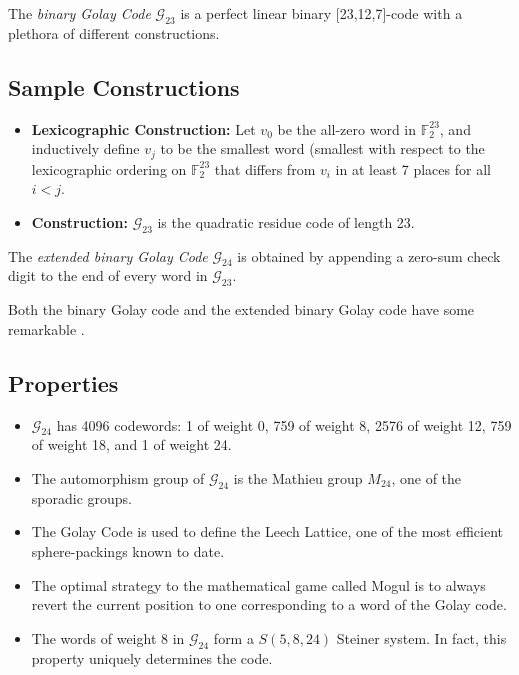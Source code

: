 \documentclass[12pt]{article}
\newcommand{\mc}{\mathcal}
\newcommand{\mb}{\mathbb}
\newcommand{\<}{\langle}
\renewcommand{\>}{\rangle}
\begin{document}
The \emph{binary Golay Code} $\mc{G}_{23}$ is a perfect linear binary [23,12,7]-code with a plethora of different  constructions.

\subsection*{Sample Constructions}
\begin{itemize}
\item {\bf Lexicographic Construction:}  Let $v_0$ be the all-zero word in $\mb{F}_2^{23}$, and inductively define $v_j$ to be the smallest word (smallest with respect to the lexicographic ordering on $\mb{F}_2^{23}$ that differs from $v_i$ in at least 7 places for all $i<j$.  
\item {\bf {} Construction:}  $\mc{G}_{23}$ is the quadratic residue code of length 23.
\end{itemize}

The \emph{extended binary Golay Code} $\mc{G}_{24}$ is obtained by appending a zero-sum check digit to the end of every word in $\mc{G}_{23}$. 

Both the binary Golay code and the extended binary Golay code have some remarkable .

\subsection*{Properties}
\begin{itemize}
\item $\mc{G}_{24}$ has 4096 codewords:  1 of weight 0, 759 of weight 8, 2576 of weight 12, 759 of weight 18, and 1 of weight 24.
\item The automorphism group of $\mc{G}_{24}$ is the Mathieu group $M_{24}$, one of the sporadic groups.
\item The Golay Code is used to define the Leech Lattice, one of the most efficient sphere-packings known to date.
\item The optimal strategy to the mathematical game called Mogul is to always revert the current position to one corresponding to a word of the Golay code.
\item The words of weight 8 in $\mc{G}_{24}$ form a $S(5,8,24)$ Steiner system.  In fact, this property uniquely determines the code.
\end{itemize}
\end{document}
